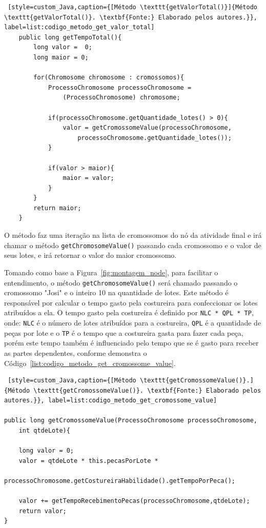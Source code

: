 \begin{lstlisting} [style=custom_Java,caption={[Método \texttt{getValorTotal()}]{Método \texttt{getValorTotal()}. \textbf{Fonte:} Elaborado pelos autores.}}, label=list:codigo_metodo_get_valor_total] 	
	public long getTempoTotal(){
		long valor =  0;
		long maior = 0;
		
		for(Chromosome chromosome : cromossomos){
			ProcessoChromosome processoChromosome = 
				(ProcessoChromosome) chromosome;
		
			if(processoChromosome.getQuantidade_lotes() > 0){
				valor = getCromossomeValue(processoChromosome,
					processoChromosome.getQuantidade_lotes());
			}
	
			if(valor > maior){
				maior = valor;
			}
		}
		return maior;
	}

\end{lstlisting}


\par O método faz uma iteração na lista de cromossomos do nó da atividade final e irá chamar o método \texttt{getChromosomeValue()} passando 
cada cromossomo e o valor de seus lotes, e irá retornar o valor do maior cromossomo.

\par Tomando como base a Figura~\ref{fig:montagem_node}, para facilitar o
entendimento, o método \texttt{getChromosomeValue()} será chamado passando o cromossomo "Josi" e o inteiro 10 na quantidade de lotes. 
Este método é responsável por calcular o tempo gasto 
pela costureira para confeccionar os lotes atribuídos a ela. O tempo gasto pela
costureira é definido por \texttt{NLC * QPL * TP}, onde: \texttt{NLC} é o número
de lotes atribuídos para a costureira, \texttt{QPL} é a quantidade de peças por
lote e o \texttt{TP} é o tempo que a costureira gasta para fazer cada peça, 
porém este tempo também é influenciado pelo tempo que se é gasto para receber 
as partes dependentes, conforme demonstra o Código~\ref{list:codigo_metodo_get_cromossome_value}.


\begin{lstlisting} [style=custom_Java,caption={[Método \texttt{getCromossomeValue()}.]{Método \texttt{getCromossomeValue()}. \textbf{Fonte:} Elaborado pelos autores.}}, label=list:codigo_metodo_get_cromossome_value] 	

public long getCromossomeValue(ProcessoChromosome processoChromosome,
	int qtdeLote){
	
	long valor = 0;
	valor = qtdeLote * this.pecasPorLote *
		 processoChromosome.getCostureiraHabilidade().getTempoPorPeca();

	valor += getTempoRecebimentoPecas(processoChromosome,qtdeLote);
	return valor;
}

\end{lstlisting}

